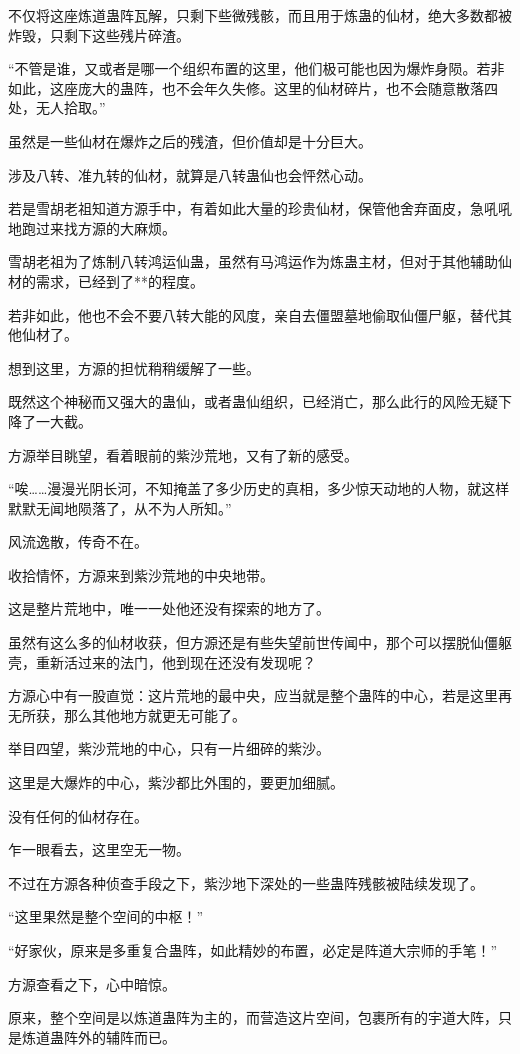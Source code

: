 \begin{this_body}
不仅将这座炼道蛊阵瓦解，只剩下些微残骸，而且用于炼蛊的仙材，绝大多数都被炸毁，只剩下这些残片碎渣。

“不管是谁，又或者是哪一个组织布置的这里，他们极可能也因为爆炸身陨。若非如此，这座庞大的蛊阵，也不会年久失修。这里的仙材碎片，也不会随意散落四处，无人拾取。”

虽然是一些仙材在爆炸之后的残渣，但价值却是十分巨大。

涉及八转、准九转的仙材，就算是八转蛊仙也会怦然心动。

若是雪胡老祖知道方源手中，有着如此大量的珍贵仙材，保管他舍弃面皮，急吼吼地跑过来找方源的大麻烦。

雪胡老祖为了炼制八转鸿运仙蛊，虽然有马鸿运作为炼蛊主材，但对于其他辅助仙材的需求，已经到了**的程度。

若非如此，他也不会不要八转大能的风度，亲自去僵盟墓地偷取仙僵尸躯，替代其他仙材了。

想到这里，方源的担忧稍稍缓解了一些。

既然这个神秘而又强大的蛊仙，或者蛊仙组织，已经消亡，那么此行的风险无疑下降了一大截。

方源举目眺望，看着眼前的紫沙荒地，又有了新的感受。

“唉……漫漫光阴长河，不知掩盖了多少历史的真相，多少惊天动地的人物，就这样默默无闻地陨落了，从不为人所知。”

风流逸散，传奇不在。

收拾情怀，方源来到紫沙荒地的中央地带。

这是整片荒地中，唯一一处他还没有探索的地方了。

虽然有这么多的仙材收获，但方源还是有些失望前世传闻中，那个可以摆脱仙僵躯壳，重新活过来的法门，他到现在还没有发现呢？

方源心中有一股直觉：这片荒地的最中央，应当就是整个蛊阵的中心，若是这里再无所获，那么其他地方就更无可能了。

举目四望，紫沙荒地的中心，只有一片细碎的紫沙。

这里是大爆炸的中心，紫沙都比外围的，要更加细腻。

没有任何的仙材存在。

乍一眼看去，这里空无一物。

不过在方源各种侦查手段之下，紫沙地下深处的一些蛊阵残骸被陆续发现了。

“这里果然是整个空间的中枢！”

“好家伙，原来是多重复合蛊阵，如此精妙的布置，必定是阵道大宗师的手笔！”

方源查看之下，心中暗惊。

原来，整个空间是以炼道蛊阵为主的，而营造这片空间，包裹所有的宇道大阵，只是炼道蛊阵外的辅阵而已。


\end{this_body}
